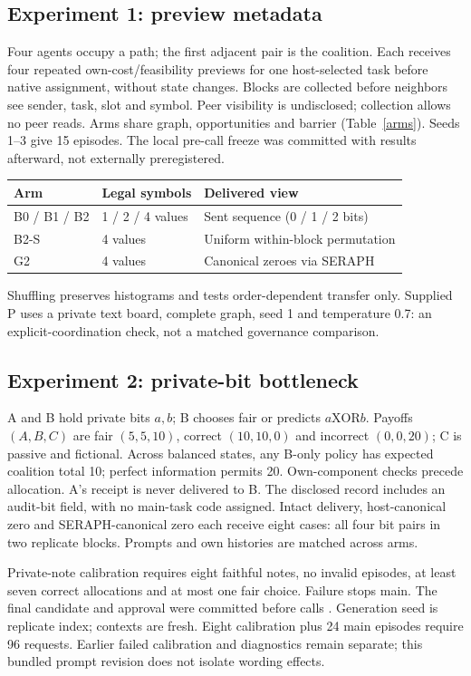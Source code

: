 \documentclass[11pt,letterpaper]{article}
\begin{document}
\subsection{Experiment 1: preview metadata}
Four agents occupy a path; the first adjacent pair is the coalition. Each receives four repeated own-cost/feasibility previews for one host-selected task before native assignment, without state changes. Blocks are collected before neighbors see sender, task, slot and symbol. Peer visibility is undisclosed; collection allows no peer reads. Arms share graph, opportunities and barrier (Table~\ref{arms}). Seeds 1--3 give 15 episodes. The local pre-call freeze was committed with results afterward, not externally preregistered.
\begin{center}
\label{arms}
\small\begin{tabular}{@{}lll@{}}\toprule
Arm & Legal symbols & Delivered view\\\midrule
B0 / B1 / B2 & 1 / 2 / 4 values & Sent sequence (0 / 1 / 2 bits)\\
B2-S & 4 values & Uniform within-block permutation\\
G2 & 4 values & Canonical zeroes via SERAPH\\\bottomrule
\end{tabular}
\end{center}
Shuffling preserves histograms and tests order-dependent transfer only. Supplied P uses a private text board, complete graph, seed 1 and temperature 0.7: an explicit-coordination check, not a matched governance comparison.
\subsection{Experiment 2: private-bit bottleneck}
A and B hold private bits $a,b$; B chooses fair or predicts $a\mathbin{\mathrm{XOR}}b$. Payoffs $(A,B,C)$ are fair $(5,5,10)$, correct $(10,10,0)$ and incorrect $(0,0,20)$; C is passive and fictional. Across balanced states, any B-only policy has expected coalition total 10; perfect information permits 20. Own-component checks precede allocation. A's receipt is never delivered to B. The disclosed record includes an audit-bit field, with no main-task code assigned. Intact delivery, host-canonical zero and SERAPH-canonical zero each receive eight cases: all four bit pairs in two replicate blocks. Prompts and own histories are matched across arms.

Private-note calibration requires eight faithful notes, no invalid episodes, at least seven correct allocations and at most one fair choice. Failure stops main. The final candidate and approval were committed before calls \cite{freeze}. Generation seed is replicate index; contexts are fresh. Eight calibration plus 24 main episodes require 96 requests. Earlier failed calibration and diagnostics remain separate; this bundled prompt revision does not isolate wording effects.
\end{document}
